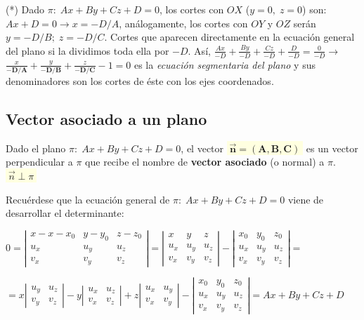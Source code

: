 \textcolor{gris}{(*) Dado $\pi:\; Ax+By+Cz+D=0$, los cortes con $OX$ ($y=0,\; z=0$) son: $Ax+D=0 \to x=-D/A$, análogamente, los cortes con $OY$ y $OZ$ serán $y=-D/B;\; z=-D/C $. Cortes que aparecen directamente en la ecuación general del plano si la dividimos toda ella por $-D$. Así, $\frac {Ax}{-D}+ \frac {By}{-D}+\frac {Cz}{-D}+\frac {D}{-D}=\frac {0}{-D} \to $ $\frac {x}{\boldsymbol{-D/A}}+\frac {y}{\boldsymbol{-D/B}}+\frac {z}{\boldsymbol{-D/C}}-1=0 $ es la \textit{ecuación segmentaria del plano} y sus denominadores son los cortes de éste con los ejes coordenados. }

\subsection{Vector asociado a un plano}

\begin{defi} Dado el plano $\pi:\; Ax+By+Cz+D=0$, el vector \colorbox{LightYellow}{$\boldsymbol{\; \vec n=(A,B,C)\;}$} es un vector perpendicular a $\pi$ que recibe el nombre de \textbf{vector asociado} (o normal) a $\pi. \quad $ \colorbox{LightYellow}{$\; \vec n \;\bot\; \pi\;$}

\end{defi}

\noindent \textcolor{gris}{Recuérdese que la ecuación general de $\pi:\; Ax+By+Cz+D=0$ viene de desarrollar el determinante:}

\noindent \textcolor{gris}{$0=\left| \begin{matrix} x-x-x_0&y-y_0&z-z_0\\u_x&u_y&u_z\\v_x&v_y&v_z\end{matrix} \right|= 
\left| \begin{matrix} x&y&z\\u_x&u_y&u_z\\v_x&v_y&v_z\end{matrix} \right| - \left| \begin{matrix} x_0&y_0&z_0\\u_x&u_y&u_z\\v_x&v_y&v_z\end{matrix} \right|=$}

\noindent \textcolor{gris}{$=x \left| \begin{matrix} u_y&u_z\\v_y&v_z \end{matrix} \right| -
y \left| \begin{matrix} u_x&u_z\\v_x&v_z \end{matrix} \right| +
z \left| \begin{matrix} u_x&u_y\\v_x&v_y \end{matrix} \right| - \left| \begin{matrix} x_0&y_0&z_0\\u_x&u_y&u_z\\v_x&v_y&v_z\end{matrix} \right|=Ax+By+Cz+D$ }

